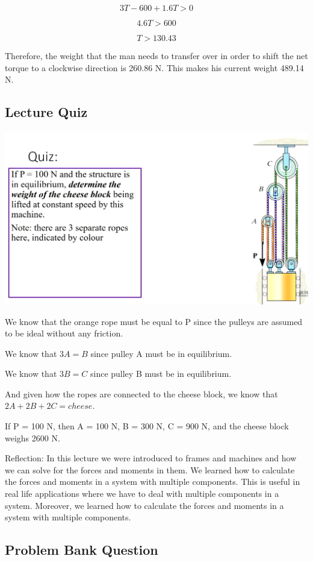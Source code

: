 \documentclass{article}[14pt, letterpaper, Times New Roman]
\begin{document}
\[ 3T - 600 + 1.6T > 0 \]

\[ 4.6T > 600 \]

\[ T > 130.43 \]

Therefore, the weight that the man needs to transfer over in order to shift the net torque to a clockwise direction is 260.86 N.
This makes his current weight 489.14 N.

\subsection{Lecture Quiz}

\includegraphics[width=15cm]{l9-quiz.png}

We know that the orange rope must be equal to P since the pulleys are assumed to be ideal without any friction.

We know that $3A = B$ since pulley A must be in equilibrium.

We know that $3B = C$ since pulley B must be in equilibrium.

And given how the ropes are connected to the cheese block, we know that $2A + 2B + 2C = cheese$.

If P = 100 N, then A = 100 N, B = 300 N, C = 900 N, and the cheese block weighs 2600 N.

\medskip

Reflection: In this lecture we were introduced to frames and machines and how we can solve for the forces and moments in them. We learned how to calculate the forces and moments in a system with multiple components. This is useful in real life applications where we have to deal with multiple components in a system. Moreover, we learned how to calculate the forces and moments in a system with multiple components.

\subsection{Problem Bank Question}
\end{document}

